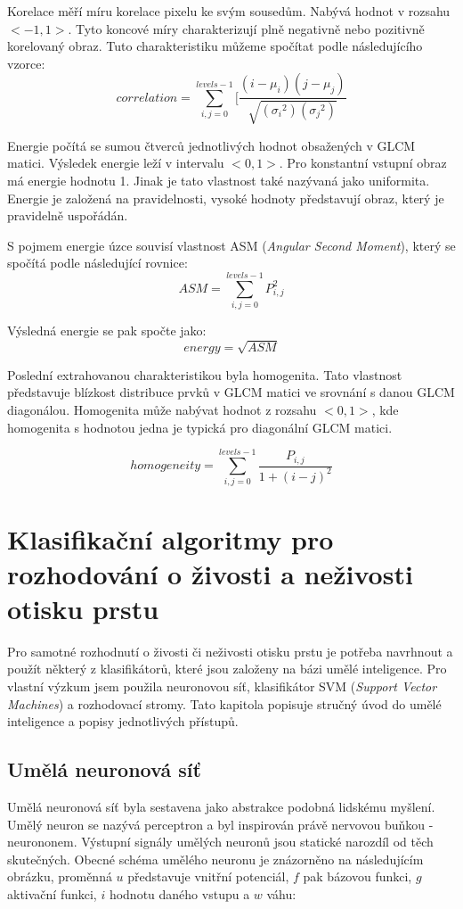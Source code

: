 Korelace měří míru korelace pixelu ke svým sousedům. Nabývá hodnot v rozsahu $<-1, 1>$. Tyto koncové míry charakterizují plně negativně nebo pozitivně korelovaný obraz. \cite{MatlabGLCM} Tuto charakteristiku můžeme spočítat podle následujícího vzorce: \cite{ScikitGLCM}
$$correlation = \sum_{i,j=0}^{levels-1}[\frac{(i-\mu_i)(j-\mu_j)}{\sqrt{({\sigma_i}^2)({\sigma_j}^2)}}$$

Energie počítá se sumou čtverců jednotlivých hodnot obsažených v GLCM matici. Výsledek energie leží v intervalu $<0, 1>$. Pro konstantní vstupní obraz má energie hodnotu 1. Jinak je tato vlastnost také nazývaná jako uniformita. Energie je založená na pravidelnosti, vysoké hodnoty představují obraz, který je pravidelně uspořádán. \cite{MatlabGLCM}

S pojmem energie úzce souvisí vlastnost ASM (\textit{Angular Second Moment}), který se spočítá podle následující rovnice: \cite{ScikitGLCM}
$$ASM = \sum_{i,j=0}^{levels-1}P_{i,j}^2$$

Výsledná energie se pak spočte jako: \cite{ScikitGLCM}
$$energy = \sqrt{ASM}$$

Poslední extrahovanou charakteristikou byla homogenita. Tato vlastnost představuje blízkost distribuce prvků v GLCM matici ve srovnání s danou GLCM diagonálou. Homogenita může nabývat hodnot z rozsahu $<0, 1>$, kde homogenita s hodnotou jedna je typická pro diagonální GLCM matici. \cite{MatlabGLCM} \cite{ScikitGLCM}

$$homogeneity = \sum_{i,j=0}^{levels-1}\frac{P_{i,j}}{1+(i-j)^2}$$


\chapter{Klasifikační algoritmy pro rozhodování o živosti a neživosti otisku prstu}
Pro samotné rozhodnutí o živosti či neživosti otisku prstu je potřeba navrhnout a použít některý z klasifikátorů, které jsou založeny na bázi umělé inteligence. Pro vlastní výzkum jsem použila neuronovou síť, klasifikátor SVM (\textit{Support Vector Machines}) a rozhodovací stromy. Tato kapitola popisuje stručný úvod do umělé inteligence a popisy jednotlivých přístupů.

\section{Umělá neuronová síť}
Umělá neuronová síť byla sestavena jako abstrakce podobná lidskému myšlení. Umělý neuron se nazývá perceptron a byl inspirován právě nervovou buňkou - neurononem. Výstupní signály umělých neuronů jsou statické narozdíl od těch skutečných. Obecné schéma umělého neuronu je znázorněno na následujícím obrázku, proměnná $u$ představuje vnitřní potenciál, $f$ pak bázovou funkci, $g$ aktivační funkci, $i$ hodnotu daného vstupu a $w$ váhu:

